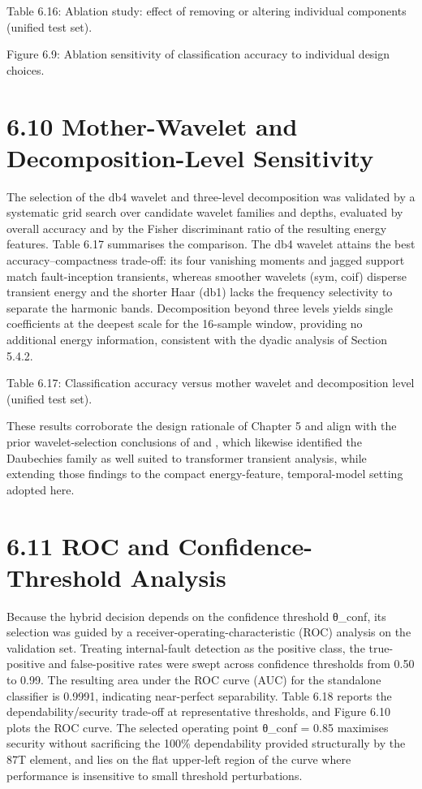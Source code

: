 Table 6.16: Ablation study: effect of removing or altering individual components (unified test set).

Figure 6.9: Ablation sensitivity of classification accuracy to individual design choices.


\section{6.10  Mother-Wavelet and Decomposition-Level Sensitivity}
The selection of the db4 wavelet and three-level decomposition was validated by a systematic grid search over candidate wavelet families and depths, evaluated by overall accuracy and by the Fisher discriminant ratio of the resulting energy features. Table 6.17 summarises the comparison. The db4 wavelet attains the best accuracy--compactness trade-off: its four vanishing moments and jagged support match fault-inception transients, whereas smoother wavelets (sym, coif) disperse transient energy and the shorter Haar (db1) lacks the frequency selectivity to separate the harmonic bands. Decomposition beyond three levels yields single coefficients at the deepest scale for the 16-sample window, providing no additional energy information, consistent with the dyadic analysis of Section 5.4.2.

Table 6.17: Classification accuracy versus mother wavelet and decomposition level (unified test set).

These results corroborate the design rationale of Chapter 5 and align with the prior wavelet-selection conclusions of \cite{ref6} and \cite{ref14}, which likewise identified the Daubechies family as well suited to transformer transient analysis, while extending those findings to the compact energy-feature, temporal-model setting adopted here.


\section{6.11  ROC and Confidence-Threshold Analysis}
Because the hybrid decision depends on the confidence threshold θ\_conf, its selection was guided by a receiver-operating-characteristic (ROC) analysis on the validation set. Treating internal-fault detection as the positive class, the true-positive and false-positive rates were swept across confidence thresholds from 0.50 to 0.99. The resulting area under the ROC curve (AUC) for the standalone classifier is 0.9991, indicating near-perfect separability. Table 6.18 reports the dependability/security trade-off at representative thresholds, and Figure 6.10 plots the ROC curve. The selected operating point θ\_conf = 0.85 maximises security without sacrificing the 100\% dependability provided structurally by the 87T element, and lies on the flat upper-left region of the curve where performance is insensitive to small threshold perturbations.

